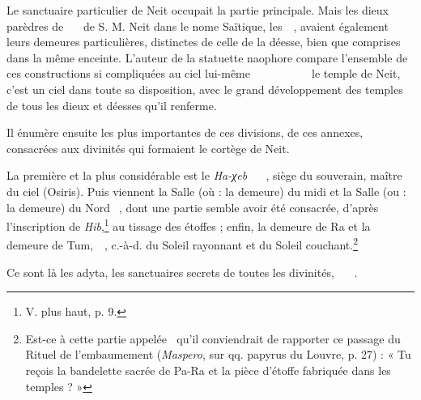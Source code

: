 \documentclass[a4paper, 11pt, oneside]{article}
\newcommand*\hieroglyhicsAAAH{}
\newcommand*\hieroglyhicsAAAO{}
\newcommand*\hieroglyhicsAAAU{}
\newcommand*\hieroglyhicsAAAX{}
\newcommand*\hieroglyhicsAABC{\raisebox{0.5ex}{}}
\newcommand*\hieroglyhicsAABR{}
\newcommand*\hieroglyhicsAACN{\raisebox{1ex}{}}
\newcommand*\hieroglyhicsAACS{}
\newcommand*\hieroglyhicsAADB{}
\newcommand*\hieroglyhicsAAEK{}
\newcommand*\hieroglyhicsAAEZ{}
\newcommand*\hieroglyhicsAAFW{}
\newcommand*\hieroglyhicsAAHA{}
\newcommand*\hieroglyhicsAAHC{}
\newcommand*\hieroglyhicsAAHK{}
\newcommand*\hieroglyhicsAAHN{}
\newcommand*\hieroglyhicsAAHO{}
\newcommand*\hieroglyhicsAAHP{}
\newcommand*\hieroglyhicsAAHQ{}
\newcommand*\hieroglyhicsAAHR{}
\newcommand*\hieroglyhicsAAHS{}
\newcommand*\hieroglyhicsAAHT{}
\newcommand*\hieroglyhicsAAHU{}
\newcommand*\hieroglyhicsAAHV{}
\newcommand*\hieroglyhicsAAHW{}
\newcommand*\hieroglyhicsAAHX{}
\newcommand*\hieroglyhicsAAHY{}
\newcommand*\hieroglyhicsAAHZ{}
\newcommand*\hieroglyhicsAAIA{}
\newcommand*\hieroglyhicsAAIB{}
\newcommand*\hieroglyhicsAAIC{}
\newcommand*\hieroglyhicsAAID{}
\newcommand*\hieroglyhicsAAIE{}
\newcommand*\hieroglyhicsAAIF{}
\newcommand*\hieroglyhicsAAIG{}
\newcommand*\hieroglyhicsAAIH{}
\begin{document}
Le sanctuaire particulier de Neit occupait la partie principale. Mais les dieux parèdres de $\hieroglyhicsAAHC\:\hieroglyhicsAACS\:\hieroglyhicsAADB\allowbreak\:\hieroglyhicsAAAO\:\hieroglyhicsAAHO\:\hieroglyhicsAAHP$ de S. M. Neit dans le nome Saïtique, les $\hieroglyhicsAAEK\:\hieroglyhicsAAEK\:\hieroglyhicsAAEK\:\hieroglyhicsAAHP$, avaient également leurs demeures particulières, distinctes de celle de la déesse, bien que comprises dans la même enceinte. L'auteur de la statuette naophore compare l'ensemble de ces constructions si compliquées au ciel lui-même $\hieroglyhicsAAAO\:\hieroglyhicsAAHK\:\hieroglyhicsAAHQ\allowbreak\:\hieroglyhicsAABR\:\hieroglyhicsAACS\:\hieroglyhicsAAHR\allowbreak\:\hieroglyhicsAAHS\:\hieroglyhicsAAEZ\:\hieroglyhicsAAHT\allowbreak\:\hieroglyhicsAACS\:\hieroglyhicsAAHR\:\hieroglyhicsAAHU\allowbreak\:\hieroglyhicsAAAO\:\hieroglyhicsAAHA\:\hieroglyhicsAAEK\allowbreak\:\hieroglyhicsAAEK\:\hieroglyhicsAAEK\:\hieroglyhicsAAHV\:\hieroglyhicsAABC\allowbreak\:\hieroglyhicsAAAH\:\hieroglyhicsAAHW\:\hieroglyhicsAAHX$ le temple de Neit, c'est un ciel dans toute sa disposition, avec le grand développement des temples de tous les dieux et déesses qu'il renferme.

Il énumère ensuite les plus importantes de ces divisions, de ces annexes, consacrées aux divinités qui formaient le cortège de Neit.

La première et la plus considérable est le \emph{Ha-χeb} $\hieroglyhicsAAFW\:\hieroglyhicsAAHY\:\hieroglyhicsAAAU\allowbreak\:\hieroglyhicsAAHZ\:\hieroglyhicsAAIA\allowbreak\:\hieroglyhicsAAIB\:\hieroglyhicsAAIC$, siège du souverain, maître du ciel (Osiris). Puis viennent la Salle (où : la demeure) du midi et la Salle (ou : la demeure) du Nord $\hieroglyhicsAAAX\:\hieroglyhicsAAID\:\hieroglyhicsAAIE$, dont une partie semble avoir été consacrée, d'après l'inscription de \emph{Hib},\footnote{V. plus haut, p. 9.} au tissage des étoffes ; enfin, la demeure de Ra et la demeure de Tum, $\hieroglyhicsAAHN\:\hieroglyhicsAAIF\:\hieroglyhicsAAHN\:\hieroglyhicsAAIG$, c.-à-d. du Soleil rayonnant et du Soleil couchant.\footnote{Est-ce à cette partie appelée $\hieroglyhicsAAHN\:\hieroglyhicsAAIF$ qu'il conviendrait de rapporter ce passage du Rituel de l'embaumement (\emph{Maspero}, sur qq. papyrus du Louvre, p. 27) : « Tu reçois la bandelette sacrée de Pa-Ra et la pièce d'étoffe fabriquée dans les temples ? »}

Ce sont là les adyta, les sanctuaires secrets de toutes les divinités, $\hieroglyhicsAAIH\:\hieroglyhicsAAHZ\:\hieroglyhicsAACN\allowbreak\:\hieroglyhicsAAEK\:\hieroglyhicsAAEK\allowbreak\:\hieroglyhicsAAEK\:\hieroglyhicsAABC$.
\end{document}
